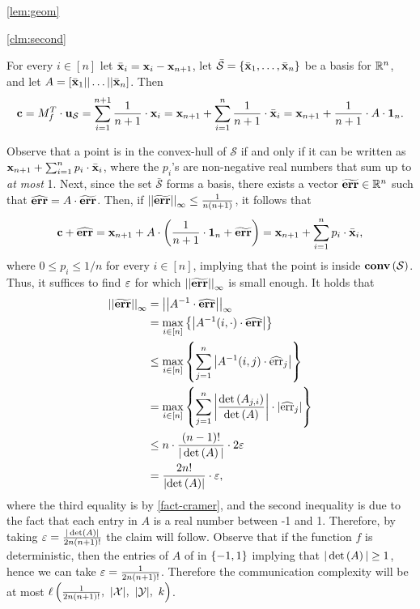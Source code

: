 \documentclass{llncs}
\renewcommand{\S}{\mathcal{S}}
\newcommand{\X}{\mathcal{X}}
\newcommand{\Y}{\mathcal{Y}}
\newcommand{\CH}[1]{\normalfont{\mathbf{conv}\of{#1}}}
\renewcommand{\c}{\myvec{c}}
\newcommand{\x}{\myvec{x}}
\newcommand{\errvec}{\myvec{err}}
\newcommand{\errval}{\operatorname{err}}
\newcommand{\ones}{\normalfont{\textbf{1}}}
\newcommand{\norm}[2]{\left|\left|#1\right|\right|_{#2}}
\renewcommand{\det}[1]{\operatorname{det}\of{#1}}
\begin{document}
\begin{proofof}{\cref{lem:geom}}
\begin{proofof}{\cref{clm:second}}

For every $i\in[n]$ let $\bar{\x}_i=\x_i-\x_{n+1}$, let $\bar{\S}=\set{\bar{\x}_1,\ldots,\bar{\x}_n}$ be a basis for ${\mathbb R}^n$, and let $A=[\bar{\x}_1||\ldots||\bar{\x}_n]$. Then
$$\c=M_f^T\cdot\myvec{u}_\S=\sum_{i=1}^{n+1} \frac{1}{n+1}\cdot \x_i=\x_{n+1}+\sum_{i=1}^n \frac{1}{n+1}\cdot\bar{\x}_i=\x_{n+1}+\frac{1}{n+1}\cdot A\cdot\ones_n.$$

Observe that a point is in the convex-hull of $\S$ if and only if it can be written as
$\x_{n+1}+\sum_{i=1}^n p_i\cdot\bar{\x}_i$,
where the $p_i$'s are non-negative real numbers that sum up to \emph{at most} 1. Next, since the set $\bar{\S}$ forms a basis, there exists a vector $\widetilde{\errvec}\in\R^{n}$ such that $\widehat{\errvec}=A\cdot\widetilde{\errvec}$. 
Then, if $\norm{\widetilde{\errvec}}{\infty}\leq\frac{1}{n(n+1)}$, it follows that
$$\c+\widehat{\errvec}=\x_{n+1}+A\cdot\left(\frac{1}{n+1}\cdot\ones_n+\widetilde{\errvec}\right)=\x_{n+1}+\sum_{i=1}^n p_i\cdot \bar{\x}_i,$$
where $0\leq p_i\leq 1/n$ for every $i\in[n]$, implying that the point is inside $\CH{\S}$. Thus, it suffices to find $\varepsilon$ for which $\norm{\widetilde{\errvec}}{\infty}$ is small enough. It holds that
\begin{align*}
\norm{\widetilde{\errvec}}{\infty}
&=\norm{A^{-1}\cdot\widehat{\errvec}}{\infty}\\
&=\max_{i\in[n]}\set{\abs{A^{-1}(i,\cdot)\cdot\widehat{\errvec}}}\\
&\leq\max_{i\in[n]}\set{\sum_{j=1}^n\abs{A^{-1}(i,j)\cdot\widehat{\errval}_j}}\\
&=\max_{i\in[n]}\set{\sum_{j=1}^n\abs{\frac{\det{A_{j,i}}}{\det{A}}}\cdot\abs{\widehat{\errval}_j}}\\
&\leq n\cdot\frac{(n-1)!}{|\det{A}|}\cdot 2\eps\\
&=\frac{2n!}{\abs{\det{A}}}\cdot\eps,
\end{align*}
where the third equality is by \cref{fact-cramer}, and the second inequality is due to the fact that each entry in $A$ is a real number between -1 and 1. Therefore, by taking $\eps=\frac{|\det{A}|}{2n(n+1)!}$ the claim will follow. Observe that if the function $f$ is deterministic, then the entries of $A$ of in $\left\{-1,1\right\}$ implying that $|\det{A}|\geq 1$, hence we can take $\varepsilon=\frac{1}{2n(n+1)!}$. Therefore the communication complexity will be at most $\ell\of{\frac{1}{2n(n+1)!},~|\X|,~|\Y|,~k}$.


\end{proofof}
\end{proofof}
\end{document}
